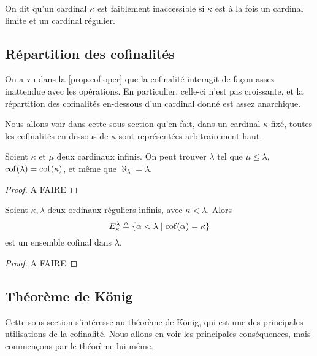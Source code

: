 \begin{definition}
  On dit qu'un cardinal $\kappa$ est faiblement inaccessible si $\kappa$ est à
  la fois un cardinal limite et un cardinal régulier.
\end{definition}

\subsection{Répartition des cofinalités}

On a vu dans la \cref{prop.cof.oper} que la cofinalité interagit de façon assez
inattendue avec les opérations. En particulier, celle-ci n'est pas croissante,
et la répartition des cofinalités en-dessous d'un cardinal donné est assez
anarchique.

Nous allons voir dans cette sous-section qu'en fait, dans un cardinal $\kappa$
fixé, toutes les cofinalités en-dessous de $\kappa$ sont représentées
arbitrairement haut.

\begin{proposition}
  Soient $\kappa$ et $\mu$ deux cardinaux infinis. On peut trouver $\lambda$ tel
  que $\mu \leq \lambda$, $\operatorname{cof}(\lambda) = \operatorname{cof}(\kappa)$, et même que
  $\aleph_\lambda = \lambda$.
\end{proposition}

\begin{proof}
  A FAIRE
\end{proof}

\begin{proposition}
  Soient $\kappa, \lambda$ deux ordinaux réguliers infinis, avec
  $\kappa < \lambda$. Alors
  \[E_\kappa^\lambda \triangleq \{\alpha < \lambda \mid \operatorname{cof}(\alpha) = \kappa\}\]
  est un ensemble cofinal dans $\lambda$.
\end{proposition}

\begin{proof}
  A FAIRE
\end{proof}

\subsection{Théorème de König}

Cette sous-section s'intéresse au théorème de König, qui est une des principales
utilisations de la cofinalité. Nous allons en voir les principales conséquences,
mais commençons par le théorème lui-même.

